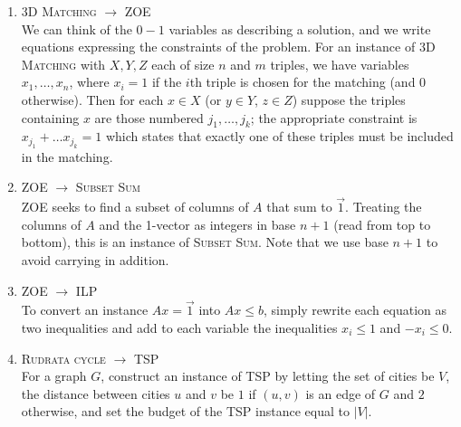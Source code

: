 \documentclass[10pt]{article}
\begin{document}
\begin{multicols}{2}
\begin{addmargin}[0.8em]{0.5em}
\begin{enumerate}[label=(\alph*)]
        \item \textsc{3D Matching} $\rightarrow$ \textsc{ZOE} \\
        We can think of the $0 - 1$ variables as describing a solution, and we write equations expressing the constraints of the problem. For an instance of \textsc{3D Matching} with $X,Y,Z$ each of size $n$ and $m$ triples, we have variables $x_1, \hdots, x_n$, where $x_i=1$ if the $i$th triple is chosen for the matching (and 0 otherwise). Then for each $x \in X$ (or $y \in Y$, $z \in Z$) suppose the triples containing $x$ are those numbered $j_1, \hdots, j_k$; the appropriate constraint is $x_{j_1} + \hdots x_{j_k} = 1$ which states that exactly one of these triples must be included in the matching. 
        
        \item \textsc{ZOE} $\rightarrow$ \textsc{Subset Sum} \\
        \textsc{ZOE} seeks to find a subset of columns of $A$ that sum to $\vec{1}$. Treating the columns of $A$ and the 1-vector as integers in base $n+1$ (read from top to bottom), this is an instance of \textsc{Subset Sum}. Note that we use base $n+1$ to avoid carrying in addition.
        
        \item \textsc{ZOE} $\rightarrow$ \textsc{ILP} \\
        To convert an instance $Ax = \vec{1}$ into $Ax \leq b$, simply rewrite each equation as two inequalities and add to each variable the inequalities $x_i \leq 1$ and $-x_i \leq 0$.
        
        \item \textsc{Rudrata cycle} $\rightarrow$ \textsc{TSP} \\
        For a graph $G$, construct an instance of \textsc{TSP} by letting the set of cities be $V$, the distance between cities $u$ and $v$ be $1$ if $(u,v)$ is an edge of $G$ and $2$ otherwise, and set the budget of the \textsc{TSP} instance equal to $|V|$.
        

\end{enumerate}
\end{addmargin}
\end{multicols}
\end{document}
